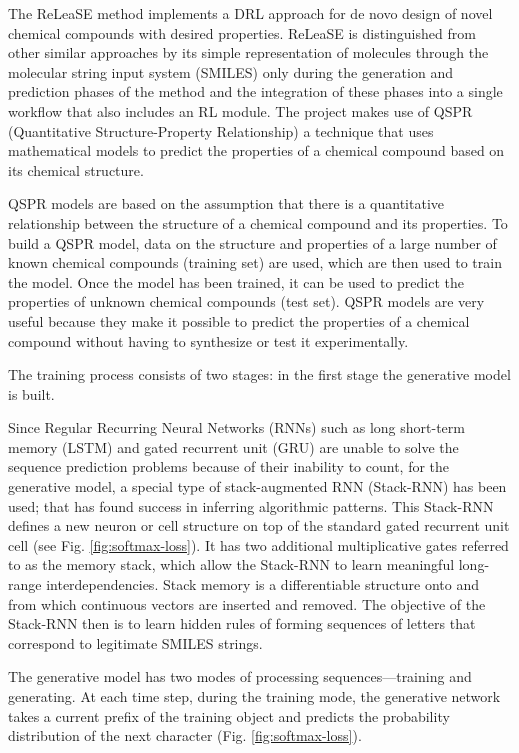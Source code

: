 \documentclass[a4paper]{article}
\begin{document}
The ReLeaSE method implements a DRL approach for de novo design of novel chemical compounds with desired properties. ReLeaSE is distinguished from other similar approaches by its simple representation of molecules through the molecular string input system (SMILES) only during the generation and prediction phases of the method and the integration of these phases into a single workflow that also includes an RL module. 
The project makes use of QSPR (Quantitative Structure-Property Relationship) a technique that uses mathematical models to predict the properties of a chemical compound based on its chemical structure. 


QSPR models are based on the assumption that there is a quantitative relationship between the structure of a chemical compound and its properties. To build a QSPR model, data on the structure and properties of a large number of known chemical compounds (training set) are used, which are then used to train the model. Once the model has been trained, it can be used to predict the properties of unknown chemical compounds (test set). QSPR models are very useful because they make it possible to predict the properties of a chemical compound without having to synthesize or test it experimentally.


The training process consists of two stages: in the first stage the generative model is built.


Since Regular Recurring Neural Networks (RNNs) such as long short-term memory (LSTM) \cite{lstm} and gated recurrent unit (GRU) \cite{gru} are unable to solve the sequence prediction problems because of their inability to count, for the generative model, a special type of stack-augmented RNN (Stack-RNN) \cite{stack-rnn} has been used; that has found success in inferring algorithmic patterns. This Stack-RNN defines a new neuron or cell structure on top of the standard gated recurrent unit \cite{grnn} cell (see Fig. \ref{fig:softmax-loss}). It has two additional multiplicative gates referred to as the memory stack, which allow the Stack-RNN to learn meaningful long-range interdependencies. Stack memory is a differentiable structure onto and from which continuous vectors are inserted and removed. The objective of the Stack-RNN then is to learn hidden rules of forming sequences of letters that correspond to legitimate SMILES strings.


The generative model has two modes of processing sequences—training and generating.  
At each time step, during the training mode, the generative network takes a current prefix of the training object and predicts the probability distribution of the next character (Fig. \ref{fig:softmax-loss}). 
\end{document}

